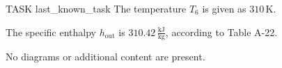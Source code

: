TASK {last_known_task}  
The temperature \( T_6 \) is given as \( 310 \, \text{K} \).  

The specific enthalpy \( h_{\text{out}} \) is \( 310.42 \, \frac{\text{kJ}}{\text{kg}} \), according to Table A-22.  

No diagrams or additional content are present.